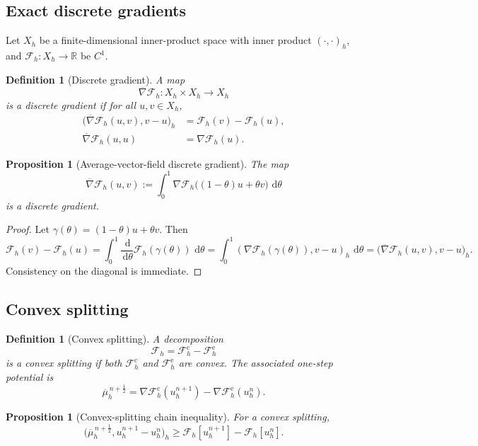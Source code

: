 \documentclass[11pt]{article}
\newtheorem{proposition}[theorem]{Proposition}
\newtheorem{definition}[theorem]{Definition}
\newcommand{\R}{\mathbb{R}}
\newcommand{\dd}{\,\mathrm{d}}
\newcommand{\F}{\mathcal{F}}
\begin{document}
\subsection{Exact discrete gradients}

Let \(X_h\) be a finite-dimensional inner-product space with inner product
\((\cdot,\cdot)_h\), and \(\F_h:X_h\to\R\) be \(C^1\).

\begin{definition}[Discrete gradient]
A map
\[
\overline{\nabla}\F_h:X_h\times X_h\to X_h
\]
is a \emph{discrete gradient} if for all \(u,v\in X_h\),
\begin{align}
\bigl(\overline{\nabla}\F_h(u,v),v-u\bigr)_h
&=
\F_h(v)-\F_h(u),\label{eq:dg1}\\
\overline{\nabla}\F_h(u,u)
&=
\nabla \F_h(u).\label{eq:dg2}
\end{align}
\end{definition}

\begin{proposition}[Average-vector-field discrete gradient]
The map
\[
\overline{\nabla}\F_h(u,v)
:=
\int_0^1 \nabla \F_h\bigl((1-\theta)u+\theta v\bigr)\,\dd\theta
\]
is a discrete gradient.
\end{proposition}

\begin{proof}
Let \(\gamma(\theta)=(1-\theta)u+\theta v\). Then
\[
\F_h(v)-\F_h(u)
=
\int_0^1 \frac{\dd}{\dd\theta}\F_h(\gamma(\theta))\,\dd\theta
=
\int_0^1 (\nabla \F_h(\gamma(\theta)),v-u)_h\,\dd\theta
=
\bigl(\overline{\nabla}\F_h(u,v),v-u\bigr)_h.
\]
Consistency on the diagonal is immediate.
\end{proof}

\subsection{Convex splitting}

\begin{definition}[Convex splitting]
A decomposition
\[
\F_h=\F_h^{\mathrm{c}}-\F_h^{\mathrm{e}}
\]
is a \emph{convex splitting} if both \(\F_h^{\mathrm{c}}\) and
\(\F_h^{\mathrm{e}}\) are convex. The associated one-step potential is
\[
\overline{\mu}_h^{\,n+\frac12}
=
\nabla \F_h^{\mathrm{c}}(u_h^{n+1})
-
\nabla \F_h^{\mathrm{e}}(u_h^n).
\]
\end{definition}

\begin{proposition}[Convex-splitting chain inequality]
For a convex splitting,
\[
\bigl(\overline{\mu}_h^{\,n+\frac12},u_h^{n+1}-u_h^n\bigr)_h
\ge
\F_h[u_h^{n+1}] - \F_h[u_h^n].
\]
\end{proposition}
\end{document}
